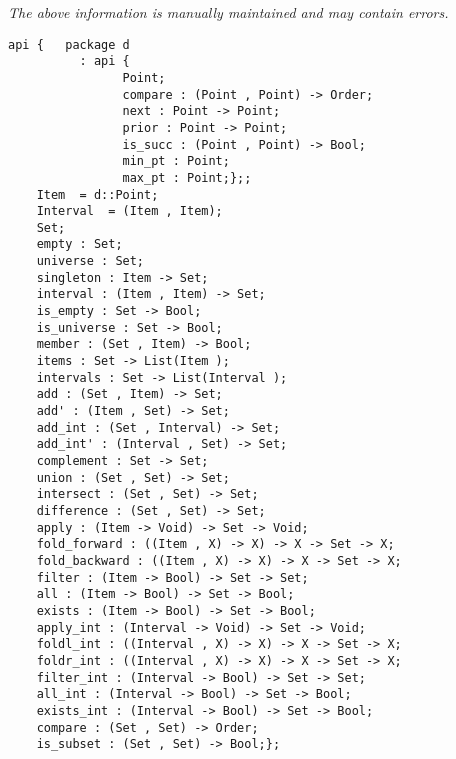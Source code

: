 \label{api:Interval\_Set}

{\tiny \it The above information is manually maintained and may contain errors.}
\begin{verbatim}
api {   package d
          : api {
                Point;
                compare : (Point , Point) -> Order;
                next : Point -> Point;
                prior : Point -> Point;
                is_succ : (Point , Point) -> Bool;
                min_pt : Point;
                max_pt : Point;};;
    Item  = d::Point;
    Interval  = (Item , Item);
    Set;
    empty : Set;
    universe : Set;
    singleton : Item -> Set;
    interval : (Item , Item) -> Set;
    is_empty : Set -> Bool;
    is_universe : Set -> Bool;
    member : (Set , Item) -> Bool;
    items : Set -> List(Item );
    intervals : Set -> List(Interval );
    add : (Set , Item) -> Set;
    add' : (Item , Set) -> Set;
    add_int : (Set , Interval) -> Set;
    add_int' : (Interval , Set) -> Set;
    complement : Set -> Set;
    union : (Set , Set) -> Set;
    intersect : (Set , Set) -> Set;
    difference : (Set , Set) -> Set;
    apply : (Item -> Void) -> Set -> Void;
    fold_forward : ((Item , X) -> X) -> X -> Set -> X;
    fold_backward : ((Item , X) -> X) -> X -> Set -> X;
    filter : (Item -> Bool) -> Set -> Set;
    all : (Item -> Bool) -> Set -> Bool;
    exists : (Item -> Bool) -> Set -> Bool;
    apply_int : (Interval -> Void) -> Set -> Void;
    foldl_int : ((Interval , X) -> X) -> X -> Set -> X;
    foldr_int : ((Interval , X) -> X) -> X -> Set -> X;
    filter_int : (Interval -> Bool) -> Set -> Set;
    all_int : (Interval -> Bool) -> Set -> Bool;
    exists_int : (Interval -> Bool) -> Set -> Bool;
    compare : (Set , Set) -> Order;
    is_subset : (Set , Set) -> Bool;};
\end{verbatim}
